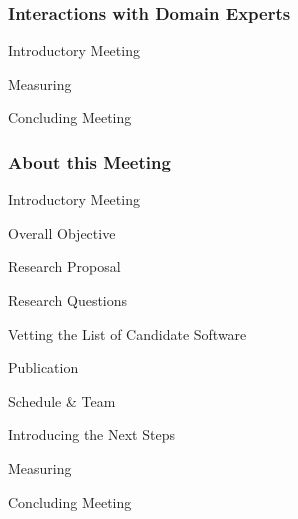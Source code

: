 \documentclass[t,12pt,numbers,fleqn]{beamer}
\begin{document}



\newif\ifcomments\commentstrue

\ifcomments
\newcommand{\authornote}[3]{\textcolor{#1}{[#3 ---#2]}}
\newcommand{\todo}[1]{\textcolor{red}{[TODO: #1]}}
\else
\newcommand{\authornote}[3]{}
\newcommand{\todo}[1]{}
\fi

\newcommand{\wss}[1]{\authornote{blue}{SS}{#1}} %
\newcommand{\jc}[1]{\authornote{red}{JC}{#1}} %
\newcommand{\oo}[1]{\authornote{magenta}{OO}{#1}} %
\newcommand{\pmi}[1]{\authornote{green}{PM}{#1}} %
\newcommand{\ad}[1]{\authornote{brown}{AD}{#1}} %



\begin{frame}
\frametitle{Interactions with Domain Experts}

\bi
\item Introductory Meeting
\item Measuring
\item Concluding Meeting
\ei

\end{frame}


\begin{frame}
\frametitle{About this Meeting}

\bi
\item Introductory Meeting
\bi
\item Overall Objective
\item Research Proposal
\item Research Questions
\item Vetting the List of Candidate Software
\item Publication
\item Schedule \& Team
\item Introducing the Next Steps
\ei
\item Measuring
\item Concluding Meeting
\ei

\end{frame}

\end{document}
